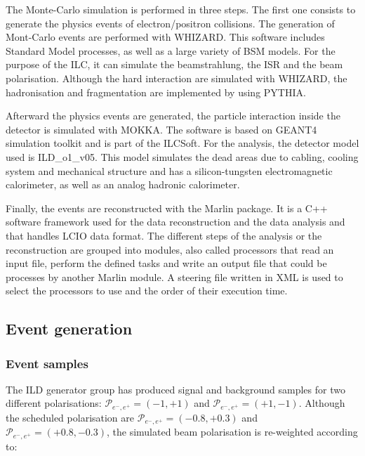     The Monte-Carlo simulation is performed in three steps.
    The first one consists to generate the physics events of electron/positron collisions.
    The generation of Mont-Carlo events are performed with WHIZARD.
    This software includes Standard Model processes, as well as a large variety of BSM models.
    For the purpose of the \gls{ILC}, it can simulate the beamstrahlung, the \gls{ISR} and the beam polarisation.
    Although the hard interaction are simulated with WHIZARD, the hadronisation and fragmentation are implemented by using PYTHIA.
    
    Afterward the physics events are generated, the particle interaction inside the detector is simulated with MOKKA.
    The software is based on GEANT4 simulation toolkit and is part of the ILCSoft.
    For the analysis, the detector model used is ILD\_o1\_v05.
    This model simulates the dead areas due to cabling, cooling system and mechanical structure and has a silicon-tungsten electromagnetic calorimeter, as well as an analog hadronic calorimeter.
    
    Finally, the events are reconstructed with the \gls{Marlin} package.
    It is a C++ software framework used for the data reconstruction and the data analysis and that handles \gls{LCIO} data format.
    The different steps of the analysis or the reconstruction are grouped into modules, also called processors that read an input file, perform the defined tasks and write an output file that could be processes by another \gls{Marlin} module.
    A steering file written in XML is used to select the processors to use and the order of their execution time.

  \subsection{Event generation}
     
     \subsubsection{Event samples}

     The \gls{ILD} generator group has produced signal and background samples for two different polarisations:  $\mathcal{P}_{e^-,e^+} = (-1,+1)$ and $\mathcal{P}_{e^-,e^+} = (+1,-1)$.
     Although the scheduled polarisation are $\mathcal{P}_{e^-,e^+} = (-0.8,+0.3)$ and  $\mathcal{P}_{e^-,e^+} = (+0.8,-0.3)$, the simulated beam polarisation is re-weighted according to:
     
